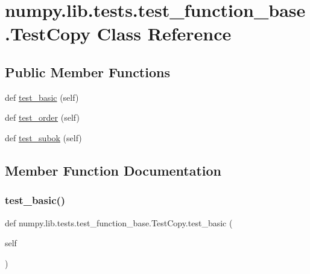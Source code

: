 \hypertarget{classnumpy_1_1lib_1_1tests_1_1test__function__base_1_1TestCopy}{}\section{numpy.\+lib.\+tests.\+test\+\_\+function\+\_\+base.\+Test\+Copy Class Reference}
\label{classnumpy_1_1lib_1_1tests_1_1test__function__base_1_1TestCopy}
\subsection*{Public Member Functions}
\begin{DoxyCompactItemize}
\item 
def \hyperlink{classnumpy_1_1lib_1_1tests_1_1test__function__base_1_1TestCopy_a0b2632b370191edde21fb81e37d66917}{test\+\_\+basic} (self)
\item 
def \hyperlink{classnumpy_1_1lib_1_1tests_1_1test__function__base_1_1TestCopy_ad1bbb259472092cde8b2e17b6c59ab74}{test\+\_\+order} (self)
\item 
def \hyperlink{classnumpy_1_1lib_1_1tests_1_1test__function__base_1_1TestCopy_ab013f722cc2d17316d830a0c1e4053d6}{test\+\_\+subok} (self)
\end{DoxyCompactItemize}


\subsection{Member Function Documentation}
\mbox{\label{classnumpy_1_1lib_1_1tests_1_1test__function__base_1_1TestCopy_a0b2632b370191edde21fb81e37d66917}} 
\subsubsection{\texorpdfstring{test\+\_\+basic()}{test\_basic()}}
{\footnotesize\ttfamily def numpy.\+lib.\+tests.\+test\+\_\+function\+\_\+base.\+Test\+Copy.\+test\+\_\+basic (\begin{DoxyParamCaption}\item[{}]{self }\end{DoxyParamCaption})}

